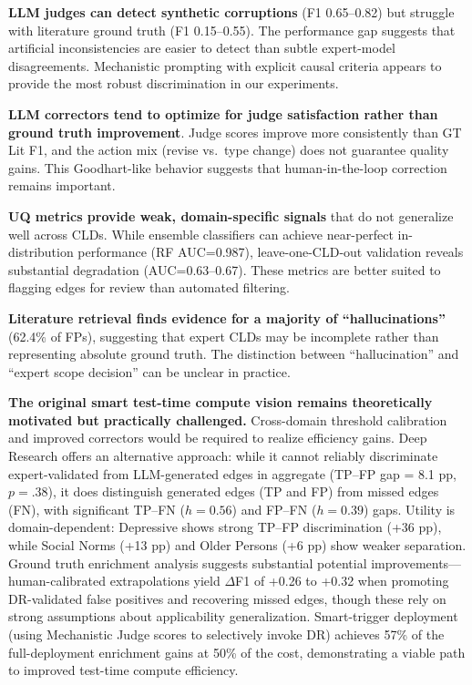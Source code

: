 \textbf{LLM judges can detect synthetic corruptions} (F1 0.65--0.82) but struggle with literature ground truth (F1 0.15--0.55). The performance gap suggests that artificial inconsistencies are easier to detect than subtle expert-model disagreements. Mechanistic prompting with explicit causal criteria appears to provide the most robust discrimination in our experiments.

\textbf{LLM correctors tend to optimize for judge satisfaction rather than ground truth improvement}. Judge scores improve more consistently than GT Lit F1, and the action mix (revise vs.\ type change) does not guarantee quality gains. This Goodhart-like behavior suggests that human-in-the-loop correction remains important.

\textbf{UQ metrics provide weak, domain-specific signals} that do not generalize well across CLDs. While ensemble classifiers can achieve near-perfect in-distribution performance (RF AUC=0.987), leave-one-CLD-out validation reveals substantial degradation (AUC=0.63--0.67). These metrics are better suited to flagging edges for review than automated filtering.

\textbf{Literature retrieval finds evidence for a majority of ``hallucinations''} (62.4\% of FPs), suggesting that expert CLDs may be incomplete rather than representing absolute ground truth. The distinction between ``hallucination'' and ``expert scope decision'' can be unclear in practice.

\textbf{The original smart test-time compute vision remains theoretically motivated but practically challenged.} Cross-domain threshold calibration and improved correctors would be required to realize efficiency gains. Deep Research offers an alternative approach: while it cannot reliably discriminate expert-validated from LLM-generated edges in aggregate (TP--FP gap = 8.1 pp, $p = .38$), it does distinguish generated edges (TP and FP) from missed edges (FN), with significant TP--FN ($h=0.56$) and FP--FN ($h=0.39$) gaps. Utility is domain-dependent: Depressive shows strong TP--FP discrimination (+36 pp), while Social Norms (+13 pp) and Older Persons (+6 pp) show weaker separation. Ground truth enrichment analysis suggests substantial potential improvements---human-calibrated extrapolations yield $\Delta$F1 of +0.26 to +0.32 when promoting DR-validated false positives and recovering missed edges, though these rely on strong assumptions about applicability generalization. Smart-trigger deployment (using Mechanistic Judge scores to selectively invoke DR) achieves 57\% of the full-deployment enrichment gains at 50\% of the cost, demonstrating a viable path to improved test-time compute efficiency.

